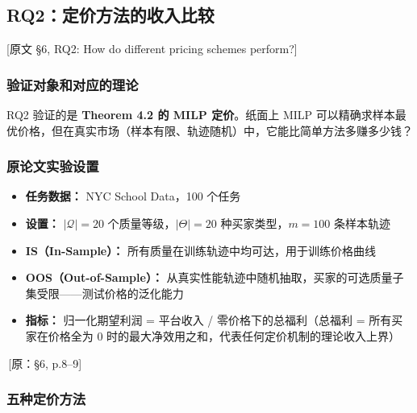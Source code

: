 \documentclass[12pt,a4paper]{article}
\newcommand{\srcref}[1]{\textcolor{black!65}{\footnotesize\,[原：#1]}}
\newcommand{\secref}[1]{\hspace{0.6em} \textcolor{black!80}{\footnotesize [原文 #1]}}
\theoremstyle{definition}
\begin{document}
\subsection{RQ2：定价方法的收入比较}
\secref{§6, RQ2: How do different pricing schemes perform?}

\subsubsection{验证对象和对应的理论}

RQ2 验证的是 \textbf{Theorem 4.2 的 MILP 定价}。纸面上 MILP 可以精确求样本最优价格，但在真实市场（样本有限、轨迹随机）中，它能比简单方法多赚多少钱？

\subsubsection{原论文实验设置}

\begin{itemize}[leftmargin=*]
    \item \textbf{任务数据：} NYC School Data，100 个任务
    \item \textbf{设置：} $|\mathcal{Q}| = 20$ 个质量等级，$|\Theta| = 20$ 种买家类型，$m = 100$ 条样本轨迹
    \item \textbf{IS（In-Sample）：} 所有质量在训练轨迹中均可达，用于训练价格曲线
    \item \textbf{OOS（Out-of-Sample）：} 从真实性能轨迹中随机抽取，买家的可选质量子集受限——测试价格的泛化能力
    \item \textbf{指标：} 归一化期望利润 = 平台收入 / 零价格下的总福利（总福利 = 所有买家在价格全为 0 时的最大净效用之和，代表任何定价机制的理论收入上界）
\end{itemize}
\srcref{§6, p.8--9}

\subsubsection{五种定价方法}
\end{document}
